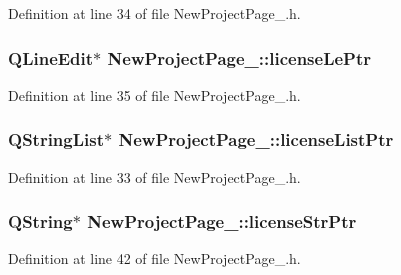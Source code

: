 Definition at line 34 of file New\-Project\-Page\-\_.\-h.

\hypertarget{class_new_project_page__3_aee5b07b36bc086e99302a67d8f3fd7b7}{
\subsubsection[{license\-Le\-Ptr}]{\setlength{\rightskip}{0pt plus 5cm}Q\-Line\-Edit$\ast$ New\-Project\-Page\-\_\-::license\-Le\-Ptr\hspace{0.3cm}{\ttfamily [private]}}}\label{class_new_project_page__3_aee5b07b36bc086e99302a67d8f3fd7b7}


Definition at line 35 of file New\-Project\-Page\-\_.\-h.

\hypertarget{class_new_project_page__3_a5bcc5f30aa601338c5ee258e21868216}{
\subsubsection[{license\-List\-Ptr}]{\setlength{\rightskip}{0pt plus 5cm}Q\-String\-List$\ast$ New\-Project\-Page\-\_\-::license\-List\-Ptr\hspace{0.3cm}{\ttfamily [private]}}}\label{class_new_project_page__3_a5bcc5f30aa601338c5ee258e21868216}


Definition at line 33 of file New\-Project\-Page\-\_.\-h.

\hypertarget{class_new_project_page__3_aa571b8638ba533ee7e6bee7c476d259e}{
\subsubsection[{license\-Str\-Ptr}]{\setlength{\rightskip}{0pt plus 5cm}Q\-String$\ast$ New\-Project\-Page\-\_\-::license\-Str\-Ptr\hspace{0.3cm}{\ttfamily [private]}}}\label{class_new_project_page__3_aa571b8638ba533ee7e6bee7c476d259e}


Definition at line 42 of file New\-Project\-Page\-\_.\-h.


